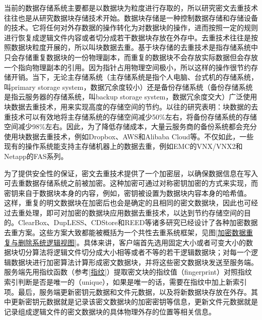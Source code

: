 \documentclass[promaster]{thesis-uestc}
\begin{document}
当前的数据存储系统主要都是以数据块为粒度进行存取的，所以研究密文去重技术往往也是从研究数据块存储技术开始。数据块存储是一种控制数据存储和存储设备的技术。它将任何对外存数据的操作转化为对数据块的操作，进而按照一定的规则进行恢复成逻辑文件内容或者切分成若干数据块存放在外存中。去重技术往往是按照数据块粒度开展的，所以叫块数据去重。基于块存储的去重技术是指存储系统中只会存储重复数据块的一份物理副本，而重复的数据块不会存放实际数据但会存放一个指向物理副本的引用。因为指针占用物理空间极小，所以这样的操作很节约存储开销。当下，无论主存储系统（主存储系统是指个人电脑、台式机的存储系统，叫primary storage system，数据冗余度较小）还是备份存储系统（备份存储系统是指云服务器的存储系统，叫backup storage system，数据冗余度交大）广泛使用块数据去重技术，用来实现高度的存储空间的节约。以往的研究表明：块数据的去重技术可以有效地将主存储系统的存储空间减少50$\%$左右，将备份存储系统的存储空间减少98$\%$左右。因此，为了降低存储成本，大量云服务商的备份系统都会充分使用块数据去重技术，例如Dropbox、AWS和Alibaba Cloud等。不仅如此，一些现有的操作系统能支持主存储机器上的数据去重，例如EMC的VNX/VNX2和Netapp的FAS系列。

为了提供安全性的保证，密文去重技术提供了一个加密层，以确保数据信息在写入可去重数据存储系统之前被加密。这种加密可通过对称密钥加密的方式来实现，而密钥来自于数据块本身的内容，例如，密钥被设置为数据块内容本身的哈希值。
这样，重复的明文数据块在加密后也会是确定的且相同的密文数据块，因此也可经过去重处理，即可对加密的数据块应用数据去重技术，以达到节约存储空间的目的。ClearBox、DupLESS、CDStore和REED等诸多研究已经设计了各种加密数据去重方案。这些方案大致都能被概括为一个共性去重系统框架，见图\ref{加密数据重复与删除系统逻辑视图}。具体来讲，客户端首先选用固定大小或者可变大小的数据块切分算法将逻辑文件切分成大小相等或者不等的若干逻辑数据块；对每一个逻辑数据块进行加密算法计算形成密文数据块，并将这些密文数据块发送至服务端。服务端先用指纹函数（参考\ref{指纹}）提取密文块的指纹值（fingerprint）对照指纹索引判断是否是唯一的（unique），如果是唯一的话，需要在指纹中加上新索引项。最后，服务端更新密钥元数据和文件元数据，以及将新数据块存放在外存。其中更新密钥元数据就是记录该密文数据块的加密密钥等信息，更新文件元数据就是记录组成逻辑文件的密文数据块的具体物理外存的位置等相关信息。
\end{document}
